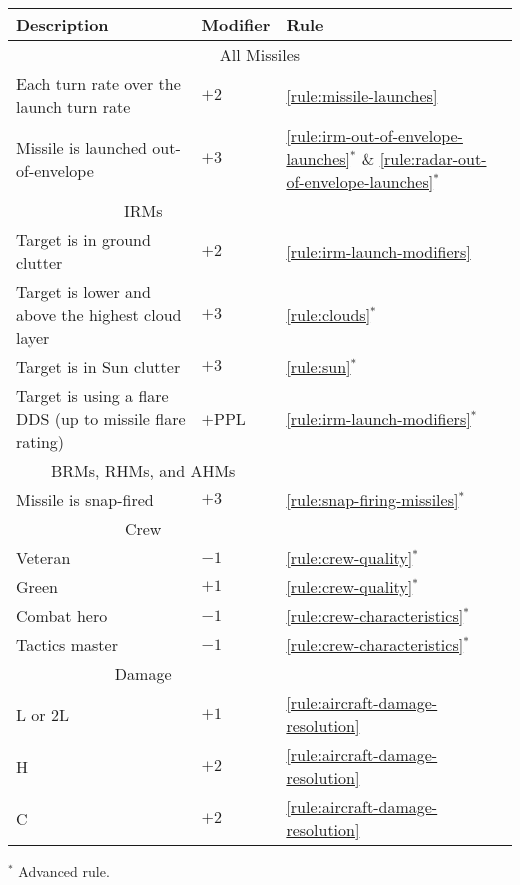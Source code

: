 {\begin{twocolumntable}
\begin{tabularx}{0.7\linewidth}{Xll}
\toprule
Description&Modifier&Rule\\
\midrule
\multicolumn{3}{c}{All Missiles}\\
\midrule
Each turn rate over the launch turn rate&$+2$&\ref{rule:missile-launches}\\
Missile is launched out-of-envelope&$+3$&\ref{rule:irm-out-of-envelope-launches}$^*$ \& \ref{rule:radar-out-of-envelope-launches}$^*$\\
\midrule
\multicolumn{2}{c}{IRMs}\\
\midrule
Target is in ground clutter&$+2$&\ref{rule:irm-launch-modifiers}\\
Target is lower and above the highest cloud layer&$+3$&\ref{rule:clouds}$^*$
\\
Target is in Sun clutter&$+3$&\ref{rule:sun}$^*$\\
Target is using a flare DDS (up to missile flare rating)&$+$PPL&\ref{rule:irm-launch-modifiers}$^*$\\
\midrule
\multicolumn{2}{c}{BRMs, RHMs, and AHMs}\\
\midrule
Missile is snap-fired&$+3$&\ref{rule:snap-firing-missiles}$^*$\\
\midrule
\multicolumn{2}{c}{Crew}\\
\midrule
Veteran&$-1$&\ref{rule:crew-quality}$^*$\\
Green&$+1$&\ref{rule:crew-quality}$^*$\\
Combat hero&$-1$&\ref{rule:crew-characteristics}$^*$\\
Tactics master&$-1$&\ref{rule:crew-characteristics}$^*$\\
\midrule
\multicolumn{2}{c}{Damage}\\
\midrule
L or 2L&$+1$&\ref{rule:aircraft-damage-resolution}\\
H&$+2$&\ref{rule:aircraft-damage-resolution}\\
C&$+2$&\ref{rule:aircraft-damage-resolution}\\
\bottomrule
\end{tabularx}
\begin{tablenote}{0.7\linewidth}
$^*$ Advanced rule.
\end{tablenote}
\end{twocolumntable}
}

